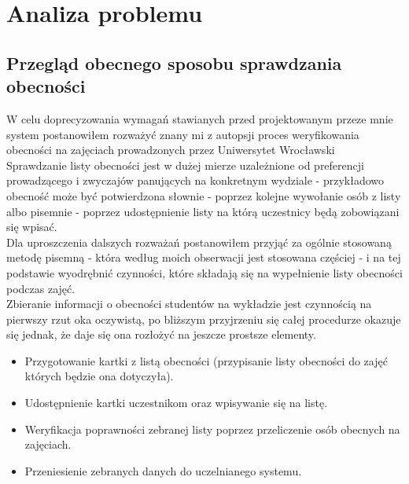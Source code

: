 \documentclass[declaration,shortabstract, mgr]{iithesis}
\begin{document}
\chapter{Analiza problemu}
\section{Przegląd obecnego sposobu sprawdzania obecności}
\indent W celu doprecyzowania wymagań stawianych przed projektowanym przeze mnie system postanowiłem rozważyć znany mi z autopsji proces weryfikowania obecności na zajęciach prowadzonych przez Uniwersytet Wrocławski\\
\indent Sprawdzanie listy obecności jest w dużej mierze uzależnione od preferencji prowadzącego i zwyczajów panujących na konkretnym wydziale - przykładowo obecność może być potwierdzona słownie - poprzez kolejne wywołanie osób z listy albo pisemnie - poprzez udostępnienie listy na którą uczestnicy będą zobowiązani się wpisać.\\
\indent Dla uproszczenia dalszych rozważań postanowiłem przyjąć za ogólnie stosowaną metodę pisemną - która według moich obserwacji jest stosowana częściej - i na tej podstawie wyodrębnić czynności, które składają się na wypełnienie listy obecności podczas zajęć.\\
\indent Zbieranie informacji o obecności studentów na wykładzie jest czynnością na pierwszy rzut oka oczywistą, po bliższym przyjrzeniu się całej procedurze okazuje się jednak, że daje się ona rozłożyć na jeszcze prostsze elementy. \\

\begin{itemize}
\item Przygotowanie kartki z listą obecności (przypisanie listy obecności do zajęć których będzie ona dotyczyła).
\item Udostępnienie kartki uczestnikom oraz wpisywanie się na listę.
\item Weryfikacja poprawności zebranej listy poprzez przeliczenie osób obecnych na zajęciach.
\item Przeniesienie zebranych danych do uczelnianego systemu.
\end{itemize}
\end{document}
